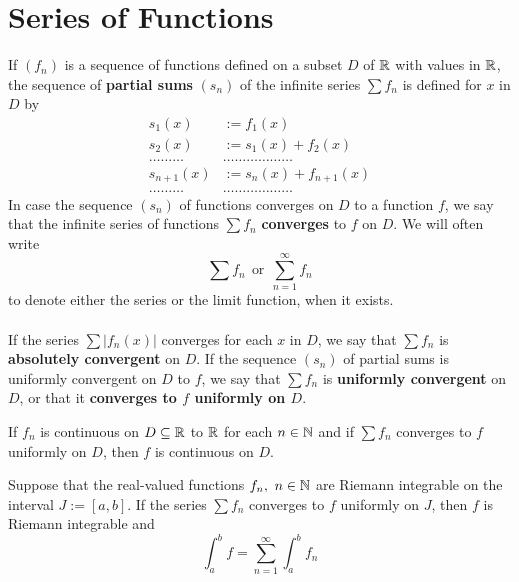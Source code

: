 \section{Series of Functions}

\begin{definition}
	If $(f_n)$ is a sequence of functions defined on a subset $D$ of $\mathbb{R}$ with values in $\mathbb{R}$, the sequence of \textbf{partial sums} $(s_n)$ of the infinite series $\sum f_n$ is defined for $x$ in $D$ by
	\begin{align*}
		s_1(x)          & :=f_1(x)                       \\
		s_2(x)          & :=s_1(x)+f_2(x)                \\
		\dots\dots\dots & \dots\dots\dots\dots\dots\dots \\
		s_{n+1}(x)      & :=s_n(x)+f_{n+1}(x)            \\
		\dots\dots\dots & \dots\dots\dots\dots\dots\dots
	\end{align*}
	In case the sequence $(s_n)$ of functions converges on $D$ to a function $f$, we say that the infinite series of functions $\sum f_n$ \textbf{converges} to $f$ on $D$. We will often write
	\[\sum f_n\ \ \text{or}\ \ \sum\limits_{n=1}^{\infty}f_n\]
	to denote either the series or the limit function, when it exists.
	\\\\If the series $\sum |f_n(x)|$ converges for each $x$ in $D$, we say that $\sum f_n$ is \textbf{absolutely convergent} on $D$. If the sequence $(s_n)$ of partial sums is uniformly convergent on $D$ to $f$, we say that $\sum f_n$ is \textbf{uniformly convergent} on $D$, or that it \textbf{converges to $f$ uniformly on $D$}.
\end{definition}

\begin{theorem}
	If $f_n$ is continuous on $D \subseteq \mathbb{R}$ to $\mathbb{R}$ for each $n \in \mathbb{N}$ and if $\sum f_n$ converges to $f$ uniformly on $D$, then $f$ is continuous on $D$.
\end{theorem}

\begin{theorem}
	Suppose that the real-valued functions $f_n,\ n \in \mathbb{N}$ are Riemann integrable on the interval $J:=[a,b]$. If the series $\sum f_n$ converges to $f$ uniformly on $J$, then $f$ is Riemann integrable and
	\[\displaystyle\int_{a}^{b}f=\sum\limits_{n=1}^{\infty}\displaystyle\int_{a}^{b}f_n\]
\end{theorem}

